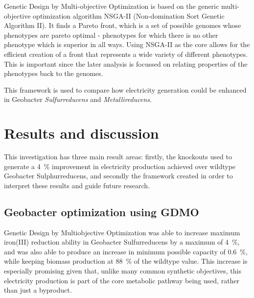 \documentclass[a4paper]{article}
\begin{document}
Genetic Design by Multi-objective Optimization is based on the generic multi-objective optimization algorithm NSGA-II (Non-domination Sort Genetic Algorithm II). It finds a Pareto front, which is a set of possible genomes whose phenotypes are pareto optimal - phenotypes for which there is no other phenotype which is superior in all ways. Using NSGA-II as the core allows for the efficient creation of a front that represents a wide variety of different phenotypes. This is important since the later analysis is focussed on relating properties of the phenotypes back to the genomes.

This framework is used to compare how electricity generation could be enhanced in Geobacter \emph{Sulfurreducens} and \emph{Metallireducens}.

\section{Results and discussion}

This investigation has three main result areas: firstly, the knockouts used to generate a \SI{4}{\percent} improvement in electricity production achieved over wildtype Geobacter Sulphurreducens, and secondly the framework created in order to interpret these results and guide future research.

\subsection{Geobacter optimization using GDMO}
Genetic Design by Multiobjective Optimization was able to increase maximum iron(III) reduction ability in Geobacter Sulfurreducens by a maximum of  \SI{4}{\percent}, and was also able to produce an increase in minimum possible capacity of  \SI{0.6}{\percent}, while keeping biomass production at  \SI{88}{\percent} of the wildtype value. This increase is especially promising given that, unlike many common synthetic objectives, this electricity production is part of the core metabolic pathway being used, rather than just a byproduct. 
\end{document}
